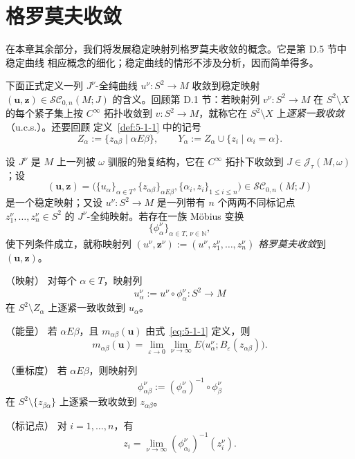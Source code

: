 
\section{格罗莫夫收敛}\label{sec:5-2}

在本章其余部分，我们将发展稳定映射列格罗莫夫收敛的概念。它是第 D.5 节中稳定曲线
相应概念的细化；稳定曲线的情形不涉及分析，因而简单得多。

下面正式定义一列 $J^\nu$-全纯曲线 $u^\nu:S^2\to M$ 收敛到稳定映射
$(\mathbf u,\mathbf z)\in\mathcal{SC}_{0,n}(M;J)$ 的含义。回顾第 D.1 节：若映射列
$v^\nu:S^2\to M$ 在 $S^2\setminus X$ 的每个紧子集上按 $C^\infty$ 拓扑收敛到
$v:S^2\to M$，就称它在 $S^2\setminus X$ 上\emph{逐紧一致收敛}（u.c.s.）。还要回顾
定义~\ref{def:5-1-1} 中的记号
\[
  Z_\alpha:=\{z_{\alpha\beta}\mid \alpha E\beta\},
  \qquad
  Y_\alpha:=Z_\alpha\cup\{z_i\mid \alpha_i=\alpha\}.
\]

\begin{definition}\label{def:5-2-1}
设 $J^\nu$ 是 $M$ 上一列被 $\omega$ 驯服的殆复结构，它在 $C^\infty$ 拓扑下收敛到
$J\in\mathcal J_\tau(M,\omega)$；设
\[
  (\mathbf u,\mathbf z)
  =\bigl(\{u_\alpha\}_{\alpha\in T},
    \{z_{\alpha\beta}\}_{\alpha E\beta},
    \{\alpha_i,z_i\}_{1\le i\le n}\bigr)
  \in\mathcal{SC}_{0,n}(M;J)
\]
是一个稳定映射；又设 $u^\nu:S^2\to M$ 是一列带有 $n$ 个两两不同标记点
$z_1^\nu,\ldots,z_n^\nu\in S^2$ 的 $J^\nu$-全纯映射。若存在一族 Möbius 变换
\[
  \{\phi_\alpha^\nu\}_{\alpha\in T,\,\nu\in\mathbb N},
\]
使下列条件成立，就称映射列
$(u^\nu,\mathbf z^\nu):=(u^\nu,z_1^\nu,\ldots,z_n^\nu)$
\emph{格罗莫夫收敛}到 $(\mathbf u,\mathbf z)$。

\medskip
\noindent\textup{（映射）}
对每个 $\alpha\in T$，映射列
\[
  u_\alpha^\nu:=u^\nu\circ\phi_\alpha^\nu:S^2\to M
\]
在 $S^2\setminus Z_\alpha$ 上逐紧一致收敛到 $u_\alpha$。

\medskip
\noindent\textup{（能量）}
若 $\alpha E\beta$，且 $m_{\alpha\beta}(\mathbf u)$ 由式~\eqref{eq:5-1-1} 定义，则
\begin{equation}\label{eq:5-2-1}
  m_{\alpha\beta}(\mathbf u)
  =\lim_{\varepsilon\to0}\lim_{\nu\to\infty}
  E\bigl(u_\alpha^\nu;B_\varepsilon(z_{\alpha\beta})\bigr).
\end{equation}

\medskip
\noindent\textup{（重标度）}
若 $\alpha E\beta$，则映射列
\[
  \phi_{\alpha\beta}^\nu
  :=(\phi_\alpha^\nu)^{-1}\circ\phi_\beta^\nu
\]
在 $S^2\setminus\{z_{\beta\alpha}\}$ 上逐紧一致收敛到 $z_{\alpha\beta}$。

\medskip
\noindent\textup{（标记点）}
对 $i=1,\ldots,n$，有
\[
  z_i=\lim_{\nu\to\infty}
  (\phi_{\alpha_i}^\nu)^{-1}(z_i^\nu).
\]
\end{definition}

